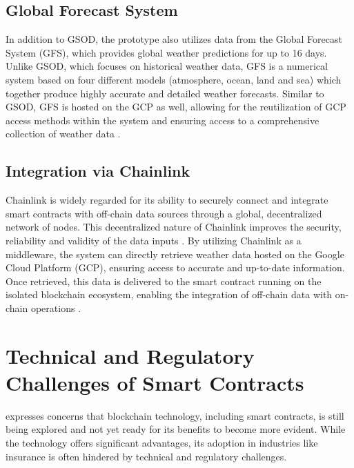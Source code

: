 \subsection{Global Forecast System}\label{GFS}
In addition to GSOD, the prototype also utilizes data from the Global Forecast System (GFS), which provides global weather predictions for up to 16 days. Unlike GSOD, which focuses on historical weather data, GFS is a numerical system based on four different models (atmosphere, ocean, land and sea) which together produce highly accurate and detailed weather forecasts. Similar to GSOD, GFS is hosted on the GCP as well, allowing for the reutilization of GCP access methods within the system and ensuring access to a comprehensive collection of weather data \autocite{NOAA_GSOD_2020}.

\subsection{Integration via Chainlink}
Chainlink is widely regarded for its ability to securely connect and integrate smart contracts with off-chain data sources through a global, decentralized network of nodes. This decentralized nature of Chainlink improves the security, reliability and validity of the data inputs \autocite{beniiche2020study}. By utilizing Chainlink as a middleware, the system can directly retrieve weather data hosted on the Google Cloud Platform (GCP), ensuring access to accurate and up-to-date information. Once retrieved, this data is delivered to the smart contract running on the isolated blockchain ecosystem, enabling the integration of off-chain data with on-chain operations \autocite{goswami2022towards}.

\section{Technical and Regulatory Challenges of Smart Contracts}\label{section:regulatory_technical_challenges}
\textcite{gatteschi2018blockchain} expresses concerns that blockchain technology, including smart contracts, is still being explored and not yet ready for its benefits to become more evident. While the technology offers significant advantages, its adoption in industries like insurance is often hindered by technical and regulatory challenges.

